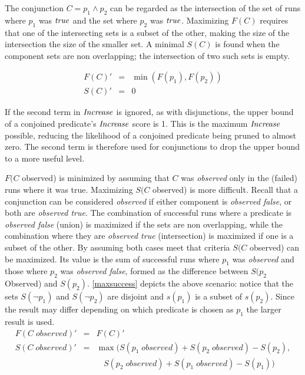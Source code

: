 The conjunction $C = p_1 \wedge p_2$ can be regarded as the intersection of the set of runs where $p_1$ was $\mathit{true}$ and the set where $p_2$ was $\mathit{true}$.  Maximizing $F(C)$ requires that one of the intersecting sets is a subset of the other, making the size of the intersection the size of the smaller set.  A minimal $S(C)$ is found when the component sets are non overlapping; the intersection of two such sets is empty.

\begin{eqnarray*}
  F(C)' &=&  \min(F(p_1),F(p_2)) \\
  S(C)' &=& 0
\end{eqnarray*}

If the second term in $\mathit{Increase}$ is ignored, as with disjunctions, the upper bound of a conjoined predicate's $\mathit{Increase}$ score is 1.  This is the maximum $\mathit{Increase}$ possible, reducing the likelihood of a conjoined predicate being pruned to almost zero.  The second term is therefore used for conjunctions to drop the upper bound to a more useful level.

$F(C$ observed) is minimized by assuming that $C$ was \textit{observed} only in the (failed) runs where it was true.  Maximizing $S(C$ observed) is more difficult.  Recall that a conjunction can be considered \textit{observed} if either component is \textit{observed false}, or both are \textit{observed true}.  The combination of successful runs where a predicate is \textit{observed false} (union) is maximized if the sets are non overlapping, while the combination where they are \textit{observed true} (intersection) is maximized if one is a subset of the other.  By assuming both cases meet that criteria $S(C$ observed) can be maximized.  Its value is the sum of successful runs where $p_1$ was \textit{observed} and those where $p_2$ was \textit{observed false}, formed as the difference between $S(p_2$  Observed) and $S(p_2)$.  \autoref{maxsuccess} depicts the above scenario: notice that the sets $S(\neg p_1)$ and $S(\neg p_2)$ are disjoint and $s(p_1)$ is a subset of $s(p_2)$.  Since the result may differ depending on which predicate is chosen as $p_1$ the larger result is used.
\begin{eqnarray*}
  F(C\;observed)' &=& F(C)' \\
  S(C\;observed)' &=&
  \max(S(p_1\;observed)+S(p_2\;observed)-S(p_2),\\
  & &\ \ \ \ S(p_2\;observed)+S(p_1\;observed)-S(p_1))
\end{eqnarray*}

